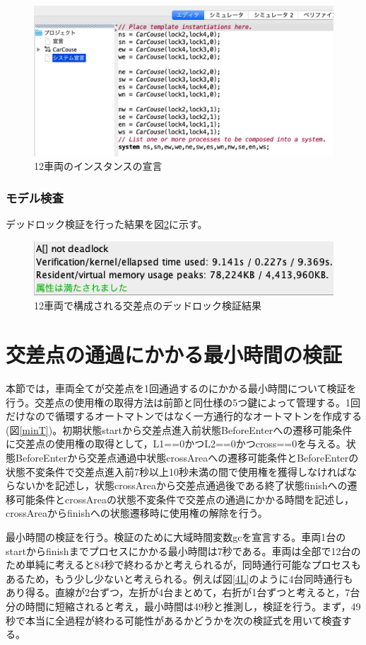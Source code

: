\documentclass{tpu-sotu}
\begin{document}
	\begin{figure}[htbp]
	\centering
	\includegraphics[width=140mm]{SimpleSD.png}
	\caption{12車両のインスタンスの宣言}
	\label{SimpleSD}
	\end{figure}
	\subsubsection{モデル検査}
	デッドロック検証を行った結果を図\ref{SimV}に示す。
	\begin{figure}[htbp]
	\centering
	\includegraphics[width=120mm]{SimV.png}
	\caption{12車両で構成される交差点のデッドロック検証結果}
	\label{SimV}
	\end{figure}
	\section{交差点の通過にかかる最小時間の検証}
	本節では，車両全てが交差点を1回通過するのにかかる最小時間について検証を行う。交差点の使用権の取得方法は前節と同仕様の5つ鍵によって管理する。1回だけなので循環するオートマトンではなく一方通行的なオートマトンを作成する(図\ref{minT})。初期状態startから交差点進入前状態BeforeEnterへの遷移可能条件に交差点の使用権の取得として，L1==0かつL2==0かつcross==0を与える。状態BeforeEnterから交差点通過中状態crossAreaへの遷移可能条件とBeforeEnterの状態不変条件で交差点進入前7秒以上10秒未満の間で使用権を獲得しなければならないかを記述し，状態crossAreaから交差点通過後である終了状態finishへの遷移可能条件とcrossAreaの状態不変条件で交差点の通過にかかる時間を記述し，crossAreaからfinishへの状態遷移時に使用権の解除を行う。
	
	最小時間の検証を行う。検証のために大域時間変数gcを宣言する。車両1台のstartからfinishまでプロセスにかかる最小時間は7秒である。車両は全部で12台のため単純に考えると84秒で終わるかと考えられるが，同時通行可能なプロセスもあるため，もう少し少ないと考えられる。例えば図\ref{4L}のように4台同時通行もあり得る。直線が2台ずつ，左折が4台まとめて，右折が1台ずつと考えると，7台分の時間に短縮されると考え，最小時間は49秒と推測し，検証を行う。まず，49秒で本当に全過程が終わる可能性があるかどうかを次の検証式を用いて検査する。
	
\end{document}
